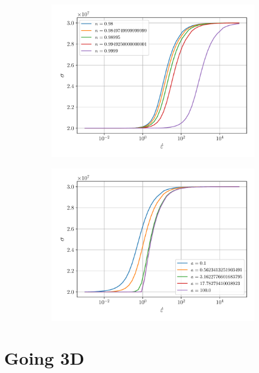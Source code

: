 \documentclass[12pt]{article}
\begin{document}
\begin{figure}[!htb]
	\begin{subfigure}{0.48\textwidth}
		\centering
		\includegraphics[width=\linewidth]{carreau-ns}
	\end{subfigure}
	\begin{subfigure}{0.48\textwidth}
		\centering
		\includegraphics[width=\linewidth]{carreau-as}
	\end{subfigure}
	
\end{figure}

\section{Going 3D}
\end{document}
